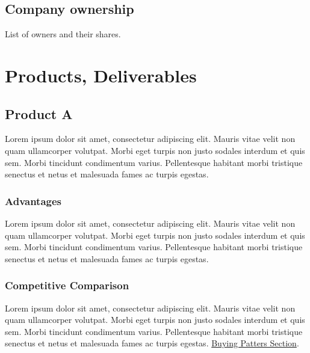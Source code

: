 \documentclass[11pt,a4paper,titlepage]{article}
\begin{document}
\subsection{Company ownership}
List of owners and their shares.
\pagebreak

\section{Products, Deliverables}
\subsection{Product A}
Lorem ipsum dolor sit amet, consectetur adipiscing elit. Mauris vitae velit 
non quam ullamcorper volutpat. Morbi eget turpis non justo sodales interdum 
et quis sem. Morbi tincidunt condimentum varius. Pellentesque habitant morbi 
tristique senectus et netus et malesuada fames ac turpis egestas.\newline

\subsubsection{Advantages}
Lorem ipsum dolor sit amet, consectetur adipiscing elit. Mauris vitae velit 
non quam ullamcorper volutpat. Morbi eget turpis non justo sodales interdum 
et quis sem. Morbi tincidunt condimentum varius. Pellentesque habitant morbi 
tristique senectus et netus et malesuada fames ac turpis egestas.\newline

\subsubsection{Competitive Comparison}
Lorem ipsum dolor sit amet, consectetur adipiscing elit. Mauris vitae velit 
non quam ullamcorper volutpat. Morbi eget turpis non justo sodales interdum 
et quis sem. Morbi tincidunt condimentum varius. Pellentesque habitant morbi 
tristique senectus et netus et malesuada fames ac turpis egestas.\newline
\hyperlink{competition_and_buying_patterns}{Buying Patters Section}.\newline\newline
\end{document}
